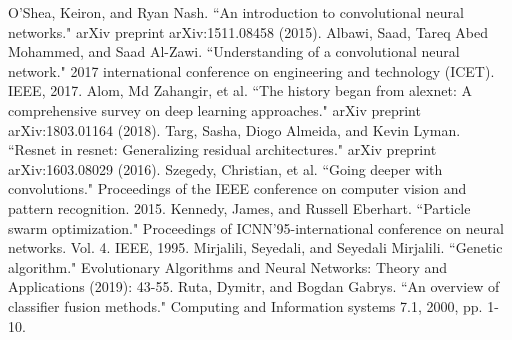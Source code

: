 \begin{thebibliography}{00}
 O'Shea, Keiron, and Ryan Nash. ``An introduction to convolutional neural networks." arXiv preprint arXiv:1511.08458 (2015).
 Albawi, Saad, Tareq Abed Mohammed, and Saad Al-Zawi. ``Understanding of a convolutional neural network." 2017 international conference on engineering and technology (ICET). IEEE, 2017.
 Alom, Md Zahangir, et al. ``The history began from alexnet: A comprehensive survey on deep learning approaches." arXiv preprint arXiv:1803.01164 (2018).
 Targ, Sasha, Diogo Almeida, and Kevin Lyman. ``Resnet in resnet: Generalizing residual architectures." arXiv preprint arXiv:1603.08029 (2016).
 Szegedy, Christian, et al. ``Going deeper with convolutions." Proceedings of the IEEE conference on computer vision and pattern recognition. 2015.
 Kennedy, James, and Russell Eberhart. ``Particle swarm optimization." Proceedings of ICNN'95-international conference on neural networks. Vol. 4. IEEE, 1995.
 Mirjalili, Seyedali, and Seyedali Mirjalili. ``Genetic algorithm." Evolutionary Algorithms and Neural Networks: Theory and Applications (2019): 43-55.
 Ruta, Dymitr, and Bogdan Gabrys. ``An overview of classifier fusion methods." Computing and Information systems 7.1, 2000, pp. 1-10.
\end{thebibliography}